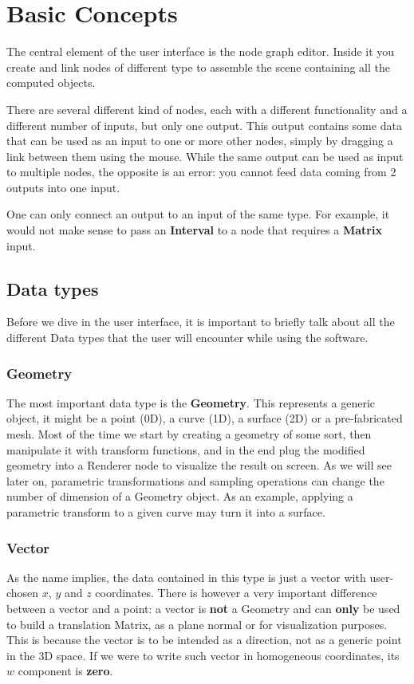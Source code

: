 \chapter{Basic Concepts}

The central element of the user interface is the node graph editor. Inside it
you create and link nodes of different type to assemble the scene containing all
the computed objects.

There are several different kind of nodes, each with a different functionality
and a different number of inputs, but only one output. This output contains
some data that can be used as an input to one or more other nodes, simply by dragging a link
between them using the mouse. While the same output can be used as input to multiple nodes,
the opposite is an error: you cannot feed data coming from 2 outputs into one input.

One can only connect an output to an input of the same type. For example, it
would not make sense to pass an \textbf{Interval} to a node that requires
a \textbf{Matrix} input.

\section{Data types}
\label{section:data_types}
Before we dive in the user interface, it is important to briefly talk about
all the different Data types that the user will encounter while using the software.

\subsection{Geometry}
The most important data type is the \textbf{Geometry}. This represents a generic
object, it might be a point (0D), a curve (1D), a surface (2D) or a pre-fabricated mesh.
Most of the time we start by creating a geometry of some sort, then
manipulate it with transform functions, and in the end plug the modified geometry
into a Renderer node to visualize the result on screen.
As we will see later on, parametric transformations and sampling operations
can change the number of dimension of a Geometry object. As an example,
applying a parametric transform to a given curve may turn it into a surface.

\subsection{Vector}
As the name implies, the data contained in this type is just a vector with
user-chosen $x$, $y$ and $z$ coordinates. There is however a very important
difference between a vector and a point: a vector is \textbf{not} a Geometry and
can \textbf{only} be used to build a translation Matrix, as a plane normal or for
visualization purposes. This is because the vector is to be intended as a direction,
not as a generic point in the 3D space. If we were to write such vector
in homogeneous coordinates, its $w$ component is \textbf{zero}.

